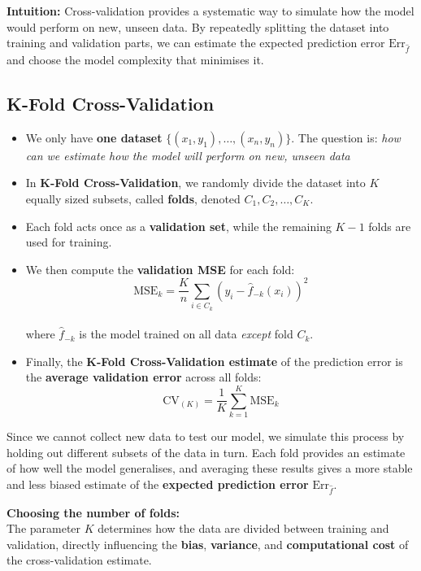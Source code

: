 \documentclass[
  letterpaper,
  DIV=11,
  numbers=noendperiod]{scrartcl}
\begin{document}
\textbf{Intuition:} Cross-validation provides a systematic way to
simulate how the model would perform on new, unseen data. By repeatedly
splitting the dataset into training and validation parts, we can
estimate the expected prediction error \(\text{Err}_{\hat{f}}\) and
choose the model complexity that minimises it.

\subsection{K-Fold Cross-Validation}\label{k-fold-cross-validation}

\begin{itemize}
\item
  We only have \textbf{one dataset}
  \(\{(x_1, y_1), \dots, (x_n, y_n)\}\). The question is: \emph{how can
  we estimate how the model will perform on new, unseen data}
\item
  In \textbf{K-Fold Cross-Validation}, we randomly divide the dataset
  into \(K\) equally sized subsets, called \textbf{folds}, denoted
  \(C_1, C_2, \dots, C_K\).
\item
  Each fold acts once as a \textbf{validation set}, while the remaining
  \(K - 1\) folds are used for training.
\item
  We then compute the \textbf{validation MSE} for each fold:
  \[\text{MSE}_k = \frac{K}{n}\sum_{i \in C_k}(y_i - \hat{f}_{-k}(x_i))^2\]\\
  where \(\hat{f}_{-k}\) is the model trained on all data \emph{except}
  fold \(C_k\).
\item
  Finally, the \textbf{K-Fold Cross-Validation estimate} of the
  prediction error is the \textbf{average validation error} across all
  folds: \[\text{CV}_{(K)} = \frac{1}{K}\sum_{k=1}^{K}\text{MSE}_k\]
\end{itemize}

Since we cannot collect new data to test our model, we simulate this
process by holding out different subsets of the data in turn. Each fold
provides an estimate of how well the model generalises, and averaging
these results gives a more stable and less biased estimate of the
\textbf{expected prediction error} \(\text{Err}_{\hat{f}}\).

\textbf{Choosing the number of folds:}\\
The parameter \(K\) determines how the data are divided between training
and validation, directly influencing the \textbf{bias},
\textbf{variance}, and \textbf{computational cost} of the
cross-validation estimate.
\end{document}
